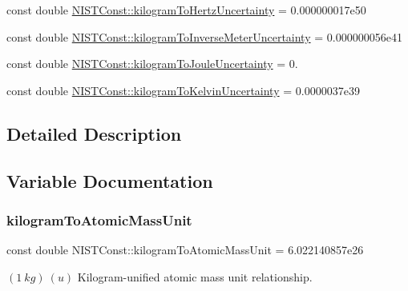 \begin{DoxyCompactItemize}
\item 
const double \hyperlink{group___n_i_s_t_const-_kilogram_ga692cf4dd08ad49aee0b148a1353c1776}{N\+I\+S\+T\+Const\+::kilogram\+To\+Hertz\+Uncertainty} = 0.\+000000017e50
\item 
const double \hyperlink{group___n_i_s_t_const-_kilogram_ga645bb9b0850ae8c2ac2fbf8d480bc013}{N\+I\+S\+T\+Const\+::kilogram\+To\+Inverse\+Meter\+Uncertainty} = 0.\+000000056e41
\item 
const double \hyperlink{group___n_i_s_t_const-_kilogram_gacf96db99d7b828aca5c24fda34406550}{N\+I\+S\+T\+Const\+::kilogram\+To\+Joule\+Uncertainty} = 0.
\item 
const double \hyperlink{group___n_i_s_t_const-_kilogram_ga744389701b8d90c75aa01618867ed42e}{N\+I\+S\+T\+Const\+::kilogram\+To\+Kelvin\+Uncertainty} = 0.\+0000037e39
\end{DoxyCompactItemize}


\subsection{Detailed Description}


\subsection{Variable Documentation}
\mbox{\label{group___n_i_s_t_const-_kilogram_gaa6a5187e436c3ce769319ad4968d53ff}} 
\subsubsection{\texorpdfstring{kilogram\+To\+Atomic\+Mass\+Unit}{kilogramToAtomicMassUnit}}
{\footnotesize\ttfamily const double N\+I\+S\+T\+Const\+::kilogram\+To\+Atomic\+Mass\+Unit = 6.\+022140857e26}

$(1\ kg)\ (u)$ Kilogram-\/unified atomic mass unit relationship. \mbox{\label{group___n_i_s_t_const-_kilogram_ga0a840aeb3ea862ed078ead0caf886dfb}} 
